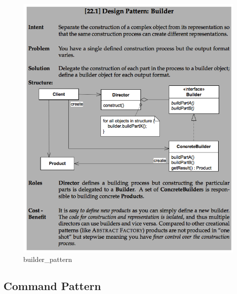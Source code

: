 \documentclass[11pt]{article}
\makeatletter
\def\maxwidth{\ifdim\Gin@nat@width>\linewidth\linewidth
    \else\Gin@nat@width\fi}
\let\Oldincludegraphics\includegraphics
\renewcommand{\includegraphics}[1]{\Oldincludegraphics[width=.8\maxwidth]{#1}}
\makeatother
\begin{document}
\begin{figure}
\centering
\includegraphics{img/builder_pattern.png}
\caption{builder\_pattern}
\end{figure}

\hypertarget{command-pattern}{%
\subsection{Command Pattern}\label{command-pattern}}
\end{document}
